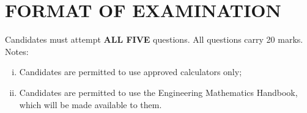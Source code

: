 \documentclass[12pts,a4paper,amsmath,amssymb,floatfix]{article}%
\begin{document}

\medskip


\section{FORMAT OF EXAMINATION}
Candidates must attempt {\bf ALL FIVE} questions. All questions carry 20 marks. Notes:
\begin{enumerate}[(i)]
\item Candidates are permitted to use approved calculators only;
\item Candidates are permitted to use the Engineering Mathematics Handbook, which will be made available to them.
\end{enumerate}

\medskip
\end{document}
